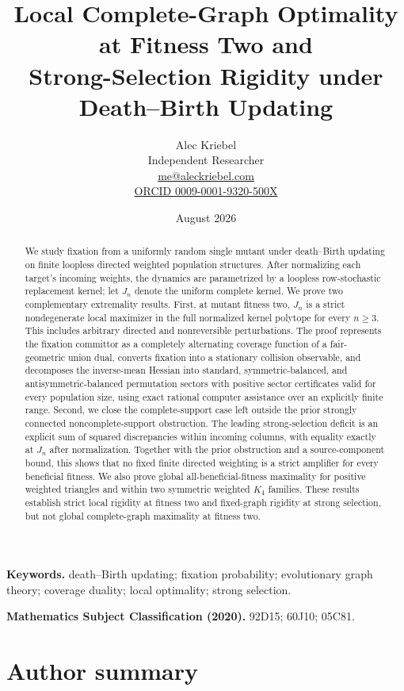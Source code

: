 \documentclass[11pt]{article}
\title{Local Complete-Graph Optimality at Fitness Two and\\
Strong-Selection Rigidity under Death--Birth Updating}
\author{Alec Kriebel\\Independent Researcher\\
\href{mailto:me@aleckriebel.com}{me@aleckriebel.com}\\
\href{https://orcid.org/0009-0001-9320-500X}{ORCID 0009-0001-9320-500X}}
\date{August 2026}
\begin{document}
\maketitle

\begin{abstract}
We study fixation from a uniformly random single mutant under death--Birth
updating on finite loopless directed weighted population structures.  After
normalizing each target's incoming weights, the dynamics are parametrized by
a loopless row-stochastic replacement kernel; let $J_n$ denote the uniform
complete kernel.  We prove two complementary extremality results.  First, at
mutant fitness two, $J_n$ is a strict nondegenerate local maximizer in the
full normalized kernel polytope for every $n\ge3$.  This includes arbitrary
directed and nonreversible perturbations.  The proof represents
the fixation committor as a completely alternating coverage function of a
fair-geometric union dual, converts fixation into a stationary collision
observable, and decomposes the inverse-mean Hessian into standard,
symmetric-balanced, and antisymmetric-balanced permutation sectors with
positive sector certificates valid for every population size, using exact
rational computer assistance over an explicitly finite range.
Second, we close the complete-support case left outside the prior strongly
connected noncomplete-support obstruction.  The leading
strong-selection deficit is an explicit sum of squared discrepancies within
incoming columns, with equality exactly at $J_n$ after normalization.
Together with the prior obstruction and a source-component bound,
this shows that no fixed finite directed weighting is a strict amplifier for
every beneficial fitness.  We also prove
global all-beneficial-fitness maximality for positive weighted triangles and
within two symmetric weighted $K_4$ families.  These results establish strict local
rigidity at fitness two and fixed-graph rigidity at strong selection, but
not global complete-graph maximality at fitness two.
\end{abstract}

\noindent\textbf{Keywords.}
death--Birth updating; fixation probability; evolutionary graph theory;
coverage duality; local optimality; strong selection.

\medskip
\noindent\textbf{Mathematics Subject Classification (2020).}
92D15; 60J10; 05C81.

\section*{Author summary}
\end{document}

